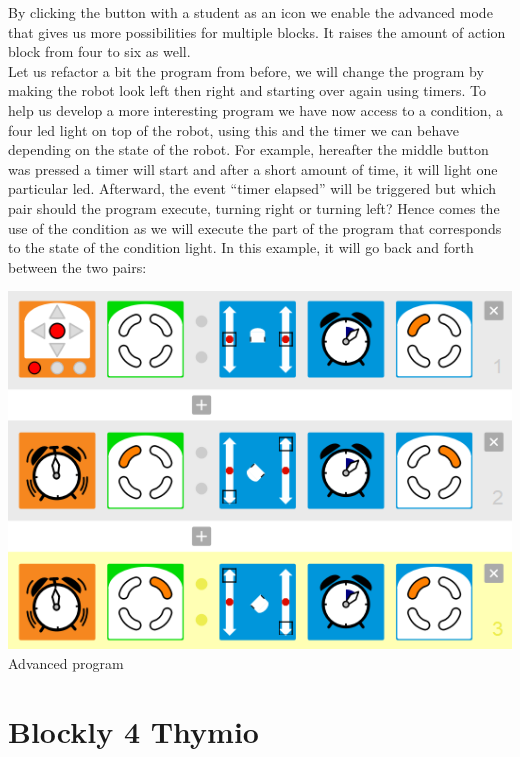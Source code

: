 \documentclass{scrbook}
\begin{document}
By clicking the button with a student as an icon we enable the advanced mode that gives us more possibilities for multiple blocks. It raises the amount of action block from four to six as well. \\

Let us refactor a bit the program from before, we will change the program by making the robot look left then right and starting over again using timers. 
To help us develop a more interesting program we have now access to a condition, a four led light on top of the robot, using this and the timer we can behave depending on the state of the robot. 
For example, hereafter the middle button was pressed a timer will start and after a short amount of time, it will light one particular led. 
Afterward, the event “timer elapsed” will be triggered but which pair should the program execute, turning right or turning left? 
Hence comes the use of the condition as we will execute the part of the program that corresponds to the state of the condition light. 
In this example, it will go back and forth between the two pairs: \\
\begin{center}
  \includegraphics[scale=0.5]{./VPL/middlebtn_3E_adv}\\
  Advanced program
\end{center}

\section{Blockly 4 Thymio}
\end{document}
